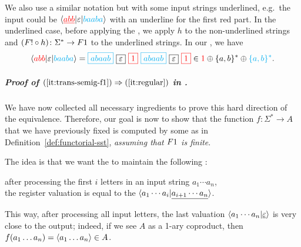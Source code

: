 We also use a similar notation but with some input strings underlined, e.g.~the input could be $\langle {\color{red}\underline{abb}} | \varepsilon | {\color{cyan}baaba} \rangle$ with an underline for the first red part. In the underlined case, before applying the , we apply $h$ to the non-underlined strings and
$(\functor! \circ h) \colon \Sigma^* \to \functor1$
to the underlined strings. In our , we have
\begin{align*}
  \tuple{\red{abb} | \varepsilon | \blue{baaba}} =  
  \blue{\boxed{abaab}} \ 
  \boxed{\varepsilon} \ 
  \red{\boxed{1}} \ 
  \blue{\boxed{abaab}} \
  \boxed{\varepsilon} \
  \red{\boxed{1}}
  \in \red{1} \oplus \set{a,b}^*  \oplus \blue{\set{a,b}^*}.
\end{align*}

\subparagraph*{Proof of $(\ref{it:trans-semig-f1}) \Rightarrow (\ref{it:regular})$ in .}
We have now collected all necessary ingredients to prove this hard direction of
the equivalence. Therefore, our goal is now to show that the function $f\colon
\Sigma^* \to A$ that we have previously fixed is computed by some  as in Definition~\ref{def:functorial-sst},
\emph{assuming that $\functor 1$ is finite}.

The idea is that we want the \functorialsst to maintain the following : 
\begin{center}
  after processing the first $i$ letters in an input string $a_1 \cdots a_n$,\\ the register valuation is equal to the \kl{factorized output} $\langle a_1 \cdots a_i | \underline{a_{i+1} \cdots a_n} \rangle$.  
\end{center}
 This way, after processing all input letters, the last valuation $\langle a_1 \cdots a_n | \underline{\varepsilon} \rangle$ is very close to the output; indeed, if we see $A$ as a 1-ary coproduct, then $f(a_1\dots a_n) = \langle a_1 \dots a_n \rangle \in A$.

